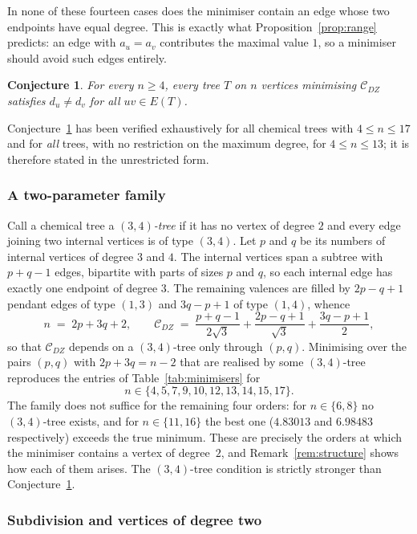 \documentclass[11pt,a4paper]{article}
\theoremstyle{plain}
\newtheorem{conjecture}[theorem]{Conjecture}
\theoremstyle{definition}
\theoremstyle{remark}
\newcommand{\CDZ}{\mathcal{C}_{DZ}}
\begin{document}
In none of these fourteen cases does the minimiser contain an edge whose two
endpoints have equal degree. This is exactly what
Proposition~\ref{prop:range} predicts: an edge with $a_u=a_v$ contributes the
maximal value $1$, so a minimiser should avoid such edges entirely.

\begin{conjecture}
\label{conj:min}
For every $n\ge4$, every tree $T$ on $n$ vertices minimising $\CDZ$ satisfies
$d_u\ne d_v$ for all $uv\in E(T)$.
\end{conjecture}

Conjecture~\ref{conj:min} has been verified exhaustively for all chemical trees
with $4\le n\le17$ and for \emph{all} trees, with no restriction on the maximum
degree, for $4\le n\le13$; it is therefore stated in the unrestricted form.

\subsubsection{A two-parameter family}
\label{sec:family}

Call a chemical tree a \emph{$(3,4)$-tree} if it has no vertex of degree $2$ and
every edge joining two internal vertices is of type $(3,4)$. Let $p$ and $q$ be
its numbers of internal vertices of degree $3$ and $4$. The internal vertices
span a subtree with $p+q-1$ edges, bipartite with parts of sizes $p$ and $q$, so
each internal edge has exactly one endpoint of degree $3$. The remaining
valences are filled by $2p-q+1$ pendant edges of type $(1,3)$ and $3q-p+1$ of
type $(1,4)$, whence
\[
  n\;=\;2p+3q+2,
  \qquad
  \CDZ\;=\;\frac{p+q-1}{2\sqrt3}+\frac{2p-q+1}{\sqrt3}+\frac{3q-p+1}{2},
\]
so that $\CDZ$ depends on a $(3,4)$-tree only through $(p,q)$. Minimising over
the pairs $(p,q)$ with $2p+3q=n-2$ that are realised by some $(3,4)$-tree
reproduces the entries of Table~\ref{tab:minimisers} for
\[
  n\in\{4,5,7,9,10,12,13,14,15,17\}.
\]
The family does not suffice for the remaining four orders: for $n\in\{6,8\}$ no
$(3,4)$-tree exists, and for $n\in\{11,16\}$ the best one ($4.83013$ and
$6.98483$ respectively) exceeds the true minimum. These are precisely the orders
at which the minimiser contains a vertex of degree~$2$, and
Remark~\ref{rem:structure} shows how each of them arises. The $(3,4)$-tree
condition is strictly stronger than Conjecture~\ref{conj:min}.

\subsubsection{Subdivision and vertices of degree two}
\label{sec:subdivision}
\end{document}
